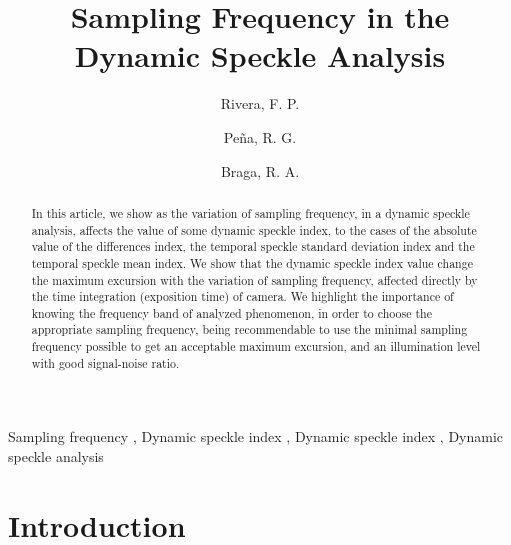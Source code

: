 \documentclass[review]{elsarticle}
\begin{document}
 

\begin{frontmatter}

\title{Sampling Frequency in the Dynamic Speckle Analysis}



\author{Rivera, F. P.}
\author{Pe\~na, R. G.}
\author{Braga, R. A.}



\address{University Federal of Lavras, Lavras, Brazil}
% 


\begin{abstract}
In this article, we show as the variation of sampling frequency, 
in a dynamic speckle analysis, affects the value of some dynamic speckle index, 
to the cases of the absolute value of the differences index, the temporal 
speckle standard deviation index and the temporal 
speckle mean index.
We show that  the dynamic speckle index value change the maximum excursion with 
the variation of sampling frequency, affected directly by the time integration 
(exposition time) of camera.
We highlight the importance of knowing  the frequency band of analyzed phenomenon, 
in order to choose the appropriate sampling frequency, 
being recommendable to use the minimal sampling frequency possible
to get an acceptable maximum excursion, 
and an illumination level with good signal-noise ratio.

\end{abstract}

\begin{keyword}
Sampling frequency \sep
Dynamic speckle index \sep 
Dynamic speckle index \sep 
Dynamic speckle analysis
\end{keyword}

\end{frontmatter}

\linenumbers


\section{Introduction}
\end{document}
